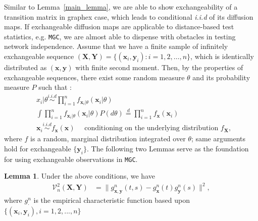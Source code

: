\documentclass[12pt]{article}
\theoremstyle{definition}
\newtheorem{lemma}[theorem]{Lemma}
\begin{document}
Similar to Lemma~\ref{main_lemma}, we are able to show exchangeability of a transition matrix in graphex case, which leads to conditional \textit{i.i.d} of its diffusion maps. If exchangeable diffusion maps are applicable to distance-based test statistics, e.g. \texttt{MGC}, we are almost able to dispense with obstacles in testing network independence. Assume that we have a finite sample of infinitely exchangeable sequence $(\mathbf{X}, \mathbf{Y}) = \{ ( \mathbf{x}_{i}, \mathbf{y}_{i} ) : i=1,2, \ldots, n \}$, which is identically distributed as $(\mathbf{x}, \mathbf{y})$ with finite second moment. Then, by the properties of exchangeable sequences, there exist some random measure $\theta$ and its probability measure $P$ such that : 
\begin{equation}
\begin{split}
& x_{i} | \theta  \overset{i.i.d}{\sim} \prod\limits_{i=1}^{n} f_{\mathbf{x}_{i} | \theta}(\mathbf{x}_{i} | \theta)  \\
& \int \prod\limits_{i=1}^{n} f_{ \mathbf{x}_{i} | \theta} ( \mathbf{x}_{i} | \theta ) P(d\theta)  \stackrel{d}{=}   \prod\limits_{i=1}^{n} f_{\mathbf{x}}(\mathbf{x}_{i})  \\
& \mathbf{x}_{i}   \overset{i.i.d}{\sim}  f_{\mathbf{x}}(\mathbf{x})  \quad \mbox{ conditioning on the underlying distribution } f_{\mathbf{X}},
\end{split}
\label{eq:iid}
\end{equation}
where $f$ is a random, marginal distribution integrated over $\theta$; same arguments hold for exchangeable $\{ \mathbf{y}_{i}  \}$. The following two Lemmas serve as the foundation for using exchangeable observations in \texttt{MGC}.

\begin{lemma}
	\label{lemma1}
   Under the above conditions, we have 
	\begin{eqnarray*}
		\mathcal{V}^{2}_{n}(\mathbf{X},\mathbf{Y}) &= \|g_{\mathbf{x},\mathbf{y}}^{n}(t,s)-g_{\mathbf{x}}^{n}(t)g_{\mathbf{y}}^{n}(s)\|^{2},
	\end{eqnarray*}
	where $g_{\cdot}^{n}$ is the empirical characteristic function based upon $\{(\mathbf{x}_{i},\mathbf{y}_{i}), i=1,2,...,n\}$
\end{lemma}
\end{document}
